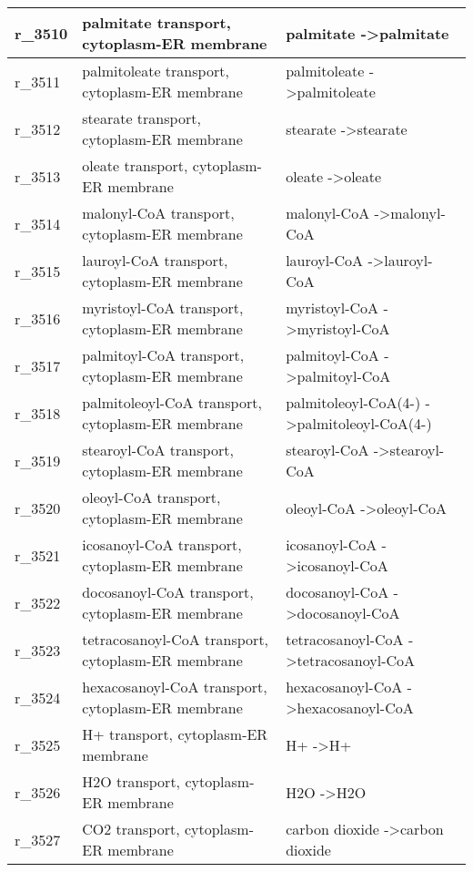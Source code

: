 \begin{landscape}
{\begin{longtable}{|l|p{7cm}|p{15cm}|}
r\_3510 & palmitate transport, cytoplasm-ER membrane & palmitate  -\textgreater palmitate \\ \hline
r\_3511 & palmitoleate transport, cytoplasm-ER membrane & palmitoleate  -\textgreater palmitoleate \\ \hline
r\_3512 & stearate transport, cytoplasm-ER membrane & stearate  -\textgreater stearate \\ \hline
r\_3513 & oleate transport, cytoplasm-ER membrane & oleate  -\textgreater oleate \\ \hline
r\_3514 & malonyl-CoA transport, cytoplasm-ER membrane & malonyl-CoA  -\textgreater malonyl-CoA \\ \hline
r\_3515 & lauroyl-CoA transport, cytoplasm-ER membrane & lauroyl-CoA  -\textgreater lauroyl-CoA \\ \hline
r\_3516 & myristoyl-CoA transport, cytoplasm-ER membrane & myristoyl-CoA  -\textgreater myristoyl-CoA \\ \hline
r\_3517 & palmitoyl-CoA transport, cytoplasm-ER membrane & palmitoyl-CoA  -\textgreater palmitoyl-CoA \\ \hline
r\_3518 & palmitoleoyl-CoA transport, cytoplasm-ER membrane & palmitoleoyl-CoA(4-)  -\textgreater palmitoleoyl-CoA(4-) \\ \hline
r\_3519 & stearoyl-CoA transport, cytoplasm-ER membrane & stearoyl-CoA  -\textgreater stearoyl-CoA \\ \hline
r\_3520 & oleoyl-CoA transport, cytoplasm-ER membrane & oleoyl-CoA  -\textgreater oleoyl-CoA \\ \hline
r\_3521 & icosanoyl-CoA transport, cytoplasm-ER membrane & icosanoyl-CoA  -\textgreater icosanoyl-CoA \\ \hline
r\_3522 & docosanoyl-CoA transport, cytoplasm-ER membrane & docosanoyl-CoA  -\textgreater docosanoyl-CoA \\ \hline
r\_3523 & tetracosanoyl-CoA transport, cytoplasm-ER membrane & tetracosanoyl-CoA  -\textgreater tetracosanoyl-CoA \\ \hline
r\_3524 & hexacosanoyl-CoA transport, cytoplasm-ER membrane & hexacosanoyl-CoA  -\textgreater hexacosanoyl-CoA \\ \hline
r\_3525 & H+ transport, cytoplasm-ER membrane & H+  -\textgreater H+ \\ \hline
r\_3526 & H2O transport, cytoplasm-ER membrane & H2O  -\textgreater H2O \\ \hline
r\_3527 & CO2 transport, cytoplasm-ER membrane & carbon dioxide  -\textgreater carbon dioxide \\ \hline

\end{longtable}}
\end{landscape}
